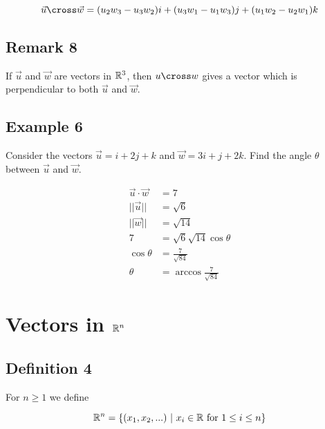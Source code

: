 \documentclass[12pt]{article} %
\begin{document}
$$
    \vec{u} \cross \vec{w} = (u_2 w_3 - u_3 w_2)i + (u_3 w_1 - u_1 w_3)j + (u_1 w_2 - u_2 w_1)k
$$

\subsection{Remark 8}
If $\vec{u}$ and $\vec{w}$ are vectors in $\mathbb{R}^3$, then $u \cross w$ gives a vector which is perpendicular to both $\vec{u}$ and $\vec{w}$.

\pagebreak

\subsection{Example 6}

\begin{grayBoxed}
    Consider the vectors $\vec{u} = i + 2j + k$ and $\vec{w} = 3i + j + 2k$. Find the angle $\theta$ between $\vec{u}$ and $\vec{w}$.
\end{grayBoxed}

\begin{align*}
    \vec{u} \cdot \vec{w} & = 7                               \\
    ||\vec{u}||           & = \sqrt{6}                        \\
    ||\vec{w}||           & = \sqrt{14}                       \\
    7                     & = \sqrt{6} \sqrt{14} \cos{\theta} \\
    \cos{\theta}          & = \frac{7}{\sqrt{84}}             \\
    \theta                & = \arccos{\frac{7}{\sqrt{84}}}
\end{align*}

\section{Vectors in $\mathbb{R}^n$}

\subsection{Definition 4}
For $n \geq 1$ we define

$$
    \mathbb{R}^n = \left\{(x_1, x_2, ...) \ | \ x_i \in \mathbb{R} \text{ for } 1 \leq i \leq n\right\}
$$
\end{document}
